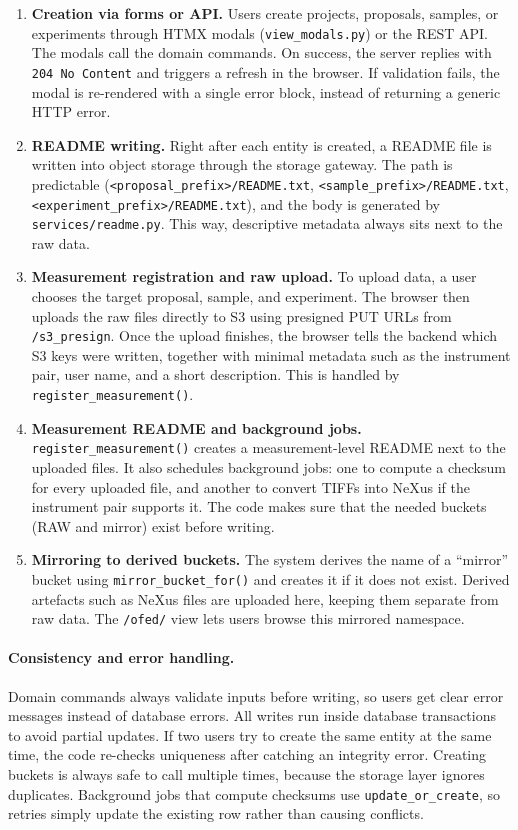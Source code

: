 \begin{enumerate}
	\item \textbf{Creation via forms or API.} Users create projects, proposals, samples, or experiments through HTMX modals 
	(\texttt{view\_modals.py}) or the REST API. The modals call the domain commands. 
	On success, the server replies with \texttt{204 No Content} and triggers a refresh in the browser. 
	If validation fails, the modal is re-rendered with a single error block, instead of returning a generic HTTP error.
	
	\item \textbf{README writing.} Right after each entity is created, a README file is written into object storage through the storage gateway. 
	The path is predictable (\texttt{<proposal\_prefix>/README.txt}, \texttt{<sample\_prefix>/README.txt}, 
	\texttt{<experiment\_prefix>/README.txt}), and the body is generated by \texttt{services/readme.py}. 
	This way, descriptive metadata always sits next to the raw data.
	
	\item \textbf{Measurement registration and raw upload.} 
	To upload data, a user chooses the target proposal, sample, and experiment. 
	The browser then uploads the raw files directly to S3 using presigned PUT URLs from \texttt{/s3\_presign}. 
	Once the upload finishes, the browser tells the backend which S3 keys were written, together with minimal metadata 
	such as the instrument pair, user name, and a short description. This is handled by \texttt{register\_measurement()}.
	
	\item \textbf{Measurement README and background jobs.} 
	\texttt{register\_measurement()} creates a measurement-level README next to the uploaded files. 
	It also schedules background jobs: one to compute a checksum for every uploaded file, and another to convert TIFFs into NeXus 
	if the instrument pair supports it. The code makes sure that the needed buckets (RAW and mirror) exist before writing.
	
	\item \textbf{Mirroring to derived buckets.} 
	The system derives the name of a “mirror” bucket using \texttt{mirror\_bucket\_for()} 
	and creates it if it does not exist. Derived artefacts such as NeXus files are uploaded here, 
	keeping them separate from raw data. The \texttt{/ofed/} view lets users browse this mirrored namespace.
\end{enumerate}

\paragraph{Consistency and error handling.}
Domain commands always validate inputs before writing, so users get clear error messages instead of database errors.  
All writes run inside database transactions to avoid partial updates.  
If two users try to create the same entity at the same time, the code re-checks uniqueness after catching an integrity error.  
Creating buckets is always safe to call multiple times, because the storage layer ignores duplicates.  
Background jobs that compute checksums use \texttt{update\_or\_create}, so retries simply update the existing row rather than causing conflicts.

